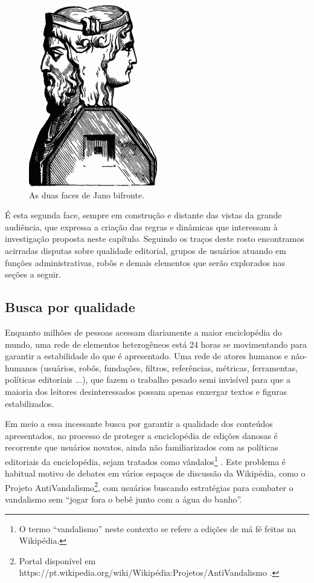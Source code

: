 \begin{figure}[H]
    \centering
    \includegraphics[width=0.5\textwidth]{Images/duas_faces_jano.png}
    \caption{As duas faces de Jano bifronte.}
    \label{fig:duas_faces_jano}
\end{figure}

É esta segunda face, sempre em construção e distante das vistas da grande audiência, que expressa a criação das regras e dinâmicas que interessam à investigação proposta neste capítulo. Seguindo os traços deste rosto encontramos acirradas disputas sobre qualidade editorial, grupos de usuários atuando em funções administrativas, robôs e demais elementos que serão explorados nas seções a seguir.

\subsection{Busca por qualidade}

Enquanto milhões de pessoas acessam diariamente a maior enciclopédia do mundo, uma rede de elementos heterogêneos está 24 horas se movimentando para garantir a estabilidade do que é apresentado. Uma rede de atores humanos e não-humanos (usuários, robôs, fundações, filtros, referências, métricas, ferramentas, políticas editoriais ...), que fazem o trabalho pesado semi invisível para que a maioria dos leitores desinteressados possam apenas enxergar textos e figuras estabilizados.

Em meio a essa incessante busca por garantir a qualidade dos conteúdos apresentados, no processo de proteger a enciclopédia de edições danosas é recorrente que usuários novatos, ainda não familiarizados com as políticas editoriais da enciclopédia, sejam tratados como vândalos\footnote{O termo ``vandalismo'' neste contexto se refere a edições de má fé feitas na Wikipédia.} \citep{halfaker_snuggle:_2014}. Este problema é habitual motivo de debates em vários espaços de discussão da Wikipédia, como o Projeto AntiVandalismo\footnote{Portal disponível em https://pt.wikipedia.org/wiki/Wikipédia:Projetos/AntiVandalismo .}, com usuários buscando estratégias para combater o vandalismo sem ``jogar fora o bebê junto com a água do banho''.

